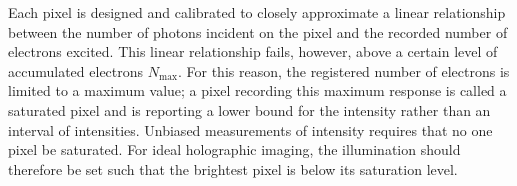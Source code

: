 Each pixel is designed and calibrated to closely approximate a linear relationship
between the number of photons incident on the pixel and the recorded number of
electrons excited.
This linear relationship fails, however, above a certain level of accumulated electrons
$N_{\text{max}}$.
For this reason, the registered number of electrons is limited to a maximum value; a
pixel recording this maximum response is called a saturated pixel and is reporting
a lower bound for the intensity rather than an interval of intensities.
Unbiased measurements of intensity requires that no one pixel be saturated.
For ideal holographic imaging, the illumination should therefore be set such that the brightest pixel is below its saturation level.




